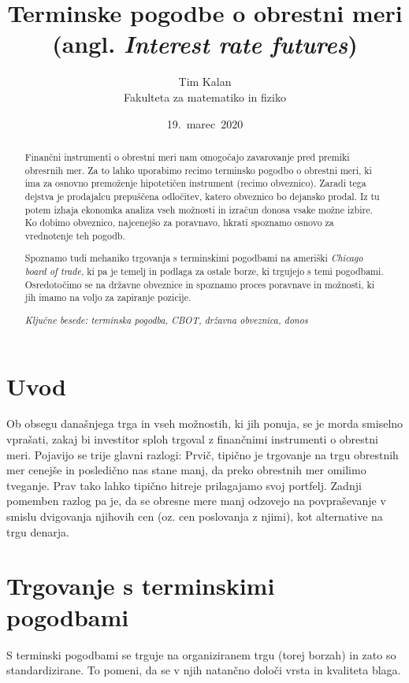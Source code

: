 \documentclass[a4paper, 11pt]{article}
\author{Tim Kalan \\ Fakulteta za matematiko in fiziko}
\title{
    Terminske pogodbe o obrestni meri \\ 
    \large (angl. \textit{Interest rate futures})}
\date{19.\ marec\ 2020} %
\begin{document}
\begin{titlepage}
    \maketitle
    \thispagestyle{empty}
\end{titlepage}

\pagebreak

\begin{abstract}
    Finančni instrumenti o obrestni meri nam omogočajo zavarovanje pred premiki obresrnih mer. Za to 
    lahko uporabimo recimo terminsko pogodbo o obrestni meri, ki ima za osnovno premoženje hipotetičen
    instrument (recimo obveznico). Zaradi tega dejstva je prodajalcu prepuščena odločitev, katero 
    obveznico bo dejansko prodal. Iz tu potem izhaja ekonomka analiza vseh možnosti in izračun donosa
    vsake možne izbire. Ko dobimo obveznico, najcenejšo za poravnavo, hkrati spoznamo osnovo za vrednotenje
    teh pogodb. 

    Spoznamo tudi mehaniko trgovanja s terminskimi pogodbami na ameriški \textit{Chicago board of trade}, ki 
    pa je temelj in podlaga za ostale borze, ki trgujejo s temi pogodbami. Osredotočimo se na državne obveznice
    in spoznamo proces poravnave in možnosti, ki jih imamo na voljo za zapiranje pozicije.

    \textit{Ključne besede: terminska pogodba, CBOT, državna obveznica, donos}
    

\end{abstract}

\pagebreak

\tableofcontents

\pagebreak

\section{Uvod}
Ob obsegu današnjega trga in vseh možnostih, ki jih ponuja, se je morda smiselno vprašati,
zakaj bi investitor sploh trgoval z finančnimi instrumenti o obrestni meri. Pojavijo se trije
glavni razlogi: Prvič, tipično je trgovanje na trgu obrestnih mer cenejše in posledično nas 
stane manj, da preko obrestnih mer omilimo tveganje. Prav tako lahko tipično hitreje prilagajamo svoj 
portfelj. Zadnji pomemben razlog pa je, da se obresne mere manj odzovejo na povpraševanje v 
smislu dvigovanja njihovih cen (oz. cen poslovanja z njimi), kot alternative na trgu denarja.

\section{Trgovanje s terminskimi pogodbami}
S terminski pogodbami se trguje na organiziranem trgu (torej borzah) in zato so standardizirane. 
To pomeni, da se v njih natančno določi vrsta in kvaliteta blaga.
\end{document}
